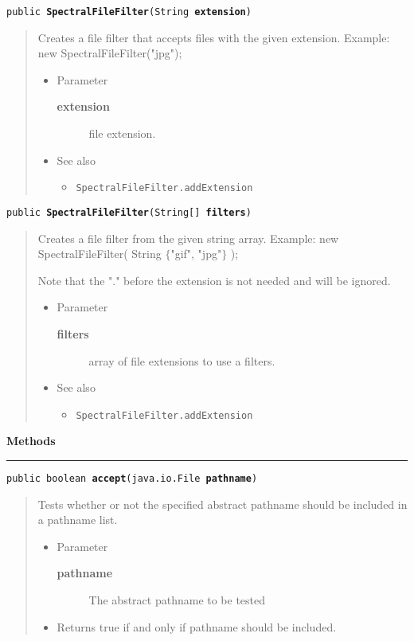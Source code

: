 \documentclass[twoside,11pt,nolof]{starlink}
\providecommand{\refdefined}[1]{}
\providecommand{\method}[1]{\texttt{#1}}
\newenvironment{desc}{\begin{quote}}{\end{quote}}
\providecommand{\methods}{
   \par\textbf{\large{Methods}}\\
   \hrule
}
\begin{document}
\method{public \textbf{SpectralFileFilter}(\texttt{String} \textbf{extension})\label{l247}\label{l248}}
\begin{desc}Creates a file filter that accepts files with the given extension.
 Example: new SpectralFileFilter("jpg");
\begin{itemize}
\item{Parameter
  \begin{description}
   \item[\textbf{extension}]{file extension.}
  \end{description}}
\end{itemize}
\begin{itemize}
\item{{See also}
  \begin{itemize}
   \item{\texttt{SpectralFileFilter.addExtension} {
\refdefined{l246}}
}
  \end{itemize}
}
\end{itemize}
\end{desc}

\method{public \textbf{SpectralFileFilter}(\texttt{String[]} \textbf{filters})\label{l249}\label{l250}}
\begin{desc}Creates a file filter from the given string array.
 Example: new SpectralFileFilter( String $\{$"gif", "jpg"$\}$ );

 Note that the "." before the extension is not needed and will
 be ignored.
\begin{itemize}
\item{Parameter
  \begin{description}
   \item[\textbf{filters}]{array of file extensions to use a filters.}
  \end{description}}
\end{itemize}
\begin{itemize}
\item{{See also}
  \begin{itemize}
   \item{\texttt{SpectralFileFilter.addExtension} {
\refdefined{l246}}
}
  \end{itemize}
}
\end{itemize}
\end{desc}

\methods
\method{public boolean \textbf{accept}(\texttt{java.io.File} \textbf{pathname})\label{l251}\label{l252}}
\begin{desc}Tests whether or not the specified abstract pathname should be
 included in a pathname list.
\begin{itemize}
\item{Parameter
  \begin{description}
   \item[\textbf{pathname}]{The abstract pathname to be tested}
  \end{description}}
\end{itemize}
\begin{itemize}
\item{Returns true if and only if pathname should be included. }
\end{itemize}
\end{desc}
\end{document}
